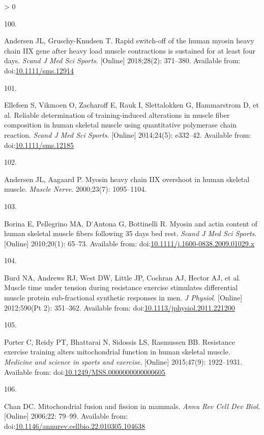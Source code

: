 \documentclass[twoside,10pt]{gihclass} %
\newlength{\cslhangindent}
\newlength{\csllabelwidth}
\newenvironment{CSLReferences}[3] %
 {%
  \setlength{\parindent}{0pt}
  \ifodd #1 \everypar{\setlength{\hangindent}{\cslhangindent}}\ignorespaces\fi
  \ifnum #2 > 0
  \setlength{\parskip}{#2\baselineskip}
  \fi
 }%
 {}
\newcommand{\CSLLeftMargin}[1]{\parbox[t]{\maxof{\widthof{#1}}{\csllabelwidth}}{#1}}
\newcommand{\CSLRightInline}[1]{\parbox[t]{\linewidth}{#1}}
\begin{document}
\begin{CSLReferences}{0}{0}
\leavevmode\hypertarget{ref-RN2056}{}%
\CSLLeftMargin{100. }
\CSLRightInline{Andersen JL, Gruschy-Knudsen T. Rapid switch-off of the human myosin heavy chain IIX gene after heavy load muscle contractions is sustained for at least four days. \emph{Scand J Med Sci Sports}. {[}Online{]} 2018;28(2): 371--380. Available from: doi:\href{https://doi.org/10.1111/sms.12914}{10.1111/sms.12914}}

\leavevmode\hypertarget{ref-RN1489}{}%
\CSLLeftMargin{101. }
\CSLRightInline{Ellefsen S, Vikmoen O, Zacharoff E, Rauk I, Slettalokken G, Hammarstrom D, et al. Reliable determination of training-induced alterations in muscle fiber composition in human skeletal muscle using quantitative polymerase chain reaction. \emph{Scand J Med Sci Sports}. {[}Online{]} 2014;24(5): e332--42. Available from: doi:\href{https://doi.org/10.1111/sms.12185}{10.1111/sms.12185}}

\leavevmode\hypertarget{ref-RN2057}{}%
\CSLLeftMargin{102. }
\CSLRightInline{Andersen JL, Aagaard P. Myosin heavy chain IIX overshoot in human skeletal muscle. \emph{Muscle Nerve}. 2000;23(7): 1095--1104. }

\leavevmode\hypertarget{ref-RN2108}{}%
\CSLLeftMargin{103. }
\CSLRightInline{Borina E, Pellegrino MA, D'Antona G, Bottinelli R. Myosin and actin content of human skeletal muscle fibers following 35 days bed rest. \emph{Scand J Med Sci Sports}. {[}Online{]} 2010;20(1): 65--73. Available from: doi:\href{https://doi.org/10.1111/j.1600-0838.2009.01029.x}{10.1111/j.1600-0838.2009.01029.x}}

\leavevmode\hypertarget{ref-RN1505}{}%
\CSLLeftMargin{104. }
\CSLRightInline{Burd NA, Andrews RJ, West DW, Little JP, Cochran AJ, Hector AJ, et al. Muscle time under tension during resistance exercise stimulates differential muscle protein sub-fractional synthetic responses in men. \emph{J Physiol}. {[}Online{]} 2012;590(Pt 2): 351--362. Available from: doi:\href{https://doi.org/10.1113/jphysiol.2011.221200}{10.1113/jphysiol.2011.221200}}

\leavevmode\hypertarget{ref-RN2608}{}%
\CSLLeftMargin{105. }
\CSLRightInline{Porter C, Reidy PT, Bhattarai N, Sidossis LS, Rasmussen BB. Resistance exercise training alters mitochondrial function in human skeletal muscle. \emph{Medicine and science in sports and exercise}. {[}Online{]} 2015;47(9): 1922--1931. Available from: doi:\href{https://doi.org/10.1249/MSS.0000000000000605}{10.1249/MSS.0000000000000605}}

\leavevmode\hypertarget{ref-RN2817}{}%
\CSLLeftMargin{106. }
\CSLRightInline{Chan DC. Mitochondrial fusion and fission in mammals. \emph{Annu Rev Cell Dev Biol}. {[}Online{]} 2006;22: 79--99. Available from: doi:\href{https://doi.org/10.1146/annurev.cellbio.22.010305.104638}{10.1146/annurev.cellbio.22.010305.104638}}


\end{CSLReferences}
\end{document}
